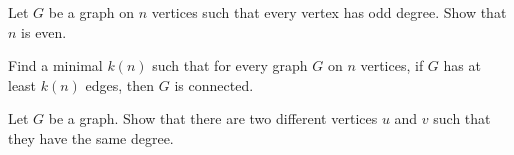 \documentclass[addpoints,answers]{exam}
\begin{document}
    \pagestyle{headandfoot}
    \runningheadrule

    \firstpagefooter{}{}{}
    \runningfooter{}{}{}
    \begin{flushright}

        \vspace{0.2in}

    \end{flushright}

    \begin{questions}
        \question
            Let $G$ be a graph on $n$ vertices such that every vertex has odd degree. Show
            that $n$ is even.
            \begin{solutionorbox}[\stretch{1}]
            \end{solutionorbox}
            \newpage
 
        \question
            Find a minimal $k(n)$ such that for every graph $G$ on $n$ vertices, if $G$ has
            at least $k(n)$ edges, then $G$ is connected.
            \begin{solutionorbox}[\stretch{1}]
            \end{solutionorbox}
            \newpage
 
        \question
            Let $G$ be a graph. Show that there are two different vertices $u$ and $v$ such
            that they have the same degree.
            \begin{solutionorbox}[\stretch{1}]
            \end{solutionorbox}
            \newpage
 
\end{questions}
\end{document}
